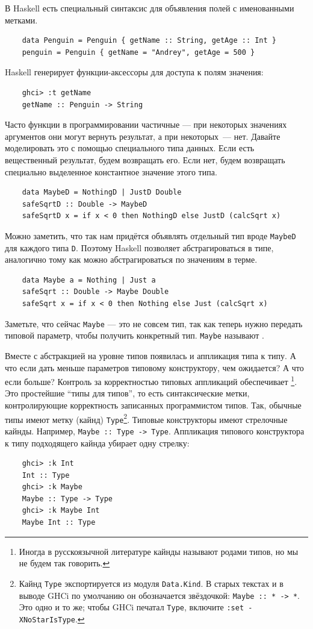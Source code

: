 В Haskell есть специальный синтаксис для объявления полей с именованными метками.
\begin{verbatim}
    data Penguin = Penguin { getName :: String, getAge :: Int }
    penguin = Penguin { getName = "Andrey", getAge = 500 }
\end{verbatim}
Haskell генерирует функции-аксессоры для доступа к полям значения:
\begin{verbatim}
    ghci> :t getName
    getName :: Penguin -> String
\end{verbatim}

Часто функции в программировании частичные --- при некоторых значениях аргументов они могут вернуть результат, а при некоторых~--- нет.
Давайте моделировать это с помощью специального типа данных.
Если есть вещественный результат, будем возвращать его.
Если нет, будем возвращать специально выделенное константное значение этого типа.
\begin{verbatim}
    data MaybeD = NothingD | JustD Double
    safeSqrtD :: Double -> MaybeD
    safeSqrtD x = if x < 0 then NothingD else JustD (calcSqrt x)
\end{verbatim}

Можно заметить, что так нам придётся объявлять отдельный тип вроде \texttt{MaybeD} для каждого типа \texttt{D}.
Поэтому Haskell позволяет абстрагироваться в типе, аналогично тому как можно абстрагироваться по значениям в терме.
\begin{verbatim}
    data Maybe a = Nothing | Just a
    safeSqrt :: Double -> Maybe Double
    safeSqrt x = if x < 0 then Nothing else Just (calcSqrt x)
\end{verbatim}

Заметьте, что сейчас \texttt{Maybe} --- это не совсем тип, так как теперь нужно передать типовой параметр, чтобы получить конкретный тип.
\texttt{Maybe} называют .

Вместе с абстракцией на уровне типов появилась и аппликация типа к типу.
А что если дать меньше параметров типовому конструктору, чем ожидается?
А что если больше?
Контроль за корректностью типовых аппликаций обеспечивает \footnote{Иногда в русскоязычной литературе кайнды называют родами типов, но мы не будем так говорить.}.
Это простейшие ``типы для типов'', то есть синтаксические метки, контролирующие корректность записанных программистом типов.
Так, обычные типы имеют метку (кайнд) \texttt{Type}\footnote{Кайнд \texttt{Type} экспортируется из модуля \texttt{Data.Kind}. В старых текстах и в выводе GHCi по умолчанию он обозначается звёздочкой: \texttt{Maybe :: * -> *}. Это одно и то же; чтобы GHCi печатал \texttt{Type}, включите \texttt{:set -XNoStarIsType}.}.
Типовые конструкторы имеют стрелочные кайнды.
Например, \texttt{Maybe :: Type -> Type}.
Аппликация типового конструктора к типу подходящего кайнда убирает одну стрелку:
\begin{verbatim}
    ghci> :k Int
    Int :: Type
    ghci> :k Maybe
    Maybe :: Type -> Type
    ghci> :k Maybe Int
    Maybe Int :: Type
\end{verbatim}

